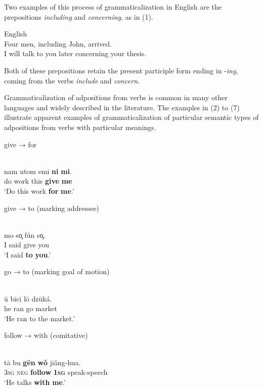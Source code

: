 \documentclass[output=paper]{langsci/langscibook}
\begin{document}
Two examples of this process of grammaticalization in English are the prepositions \textit{including} and \textit{concerning}, as in (1).

\ea
{English}\\
\ea  Four men, including John, arrived.\\
\ex  I will talk to you later concerning your thesis.\\
\z
\z

Both of these prepositions retain the present participle form ending in -\textit{ing}, coming from the verbs \textit{include} and \textit{concern}. 

Grammaticalization of adpositions from verbs is common in many other languages and widely described in the literature. The examples in (2) to (7) illustrate apparent examples of grammaticalization of particular semantic types of adpositions from verbs with particular meanings.

give → for

\ea\label{ex:dryer:}
\\
\gll   nam  utom  emi  \textbf{ni}  \textbf{mi}.\\
       do  work  this  \textbf{give}  \textbf{me}\\
\glt   ‘Do this work \textbf{for} \textbf{me}.’
\z

give → to (marking addressee)

\ea\label{ex:dryer:}
\\
\gll   mo  so̧  fún  so̧.\\
       I  said  give  you\\
\glt   ‘I said \textbf{to} \textbf{you}.’
\z

go → to (marking goal of motion)

\ea\label{ex:dryer:}
\\
\gll   ū  bīcī  lō  dzūká.\\
       he  ran  go  market\\
\glt   ‘He ran to the market.’
\z

follow → with (comitative)

\ea\label{ex:dryer:}
\\
\gll   tā  bu  \textbf{gēn}  \textbf{wǒ}  jiǎng-hua.\\
       3\textsc{sg}  \textsc{neg}  \textbf{follow}  \textbf{\textsc{1sg}}  speak-speech\\
\glt   ‘He talks \textbf{with} \textbf{me}.’
\z
\end{document}
